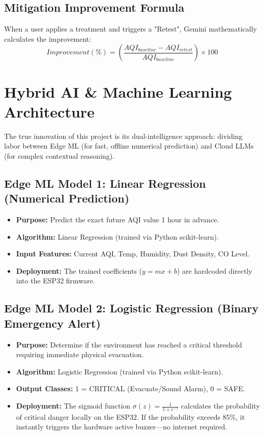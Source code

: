 \documentclass[12pt,a4paper]{report}
\begin{document}
\section{Mitigation Improvement Formula}
When a user applies a treatment and triggers a "Retest", Gemini mathematically calculates the improvement:
\begin{equation}
    Improvement (\%) = \left( \frac{AQI_{baseline} - AQI_{retest}}{AQI_{baseline}} \right) \times 100
\end{equation}

\chapter{Hybrid AI \& Machine Learning Architecture}
The true innovation of this project is its dual-intelligence approach: dividing labor between Edge ML (for fast, offline numerical prediction) and Cloud LLMs (for complex contextual reasoning).

\section{Edge ML Model 1: Linear Regression (Numerical Prediction)}
\begin{itemize}
    \item \textbf{Purpose:} Predict the exact future AQI value 1 hour in advance.
    \item \textbf{Algorithm:} Linear Regression (trained via Python scikit-learn).
    \item \textbf{Input Features:} Current AQI, Temp, Humidity, Dust Density, CO Level.
    \item \textbf{Deployment:} The trained coefficients ($y = mx + b$) are hardcoded directly into the ESP32 firmware.
\end{itemize}

\section{Edge ML Model 2: Logistic Regression (Binary Emergency Alert)}
\begin{itemize}
    \item \textbf{Purpose:} Determine if the environment has reached a critical threshold requiring immediate physical evacuation.
    \item \textbf{Algorithm:} Logistic Regression (trained via Python scikit-learn).
    \item \textbf{Output Classes:} 1 = CRITICAL (Evacuate/Sound Alarm), 0 = SAFE.
    \item \textbf{Deployment:} The sigmoid function $\sigma(z) = \frac{1}{1 + e^{-z}}$ calculates the probability of critical danger locally on the ESP32. If the probability exceeds 85\%, it instantly triggers the hardware active buzzer—no internet required.
\end{itemize}
\end{document}
